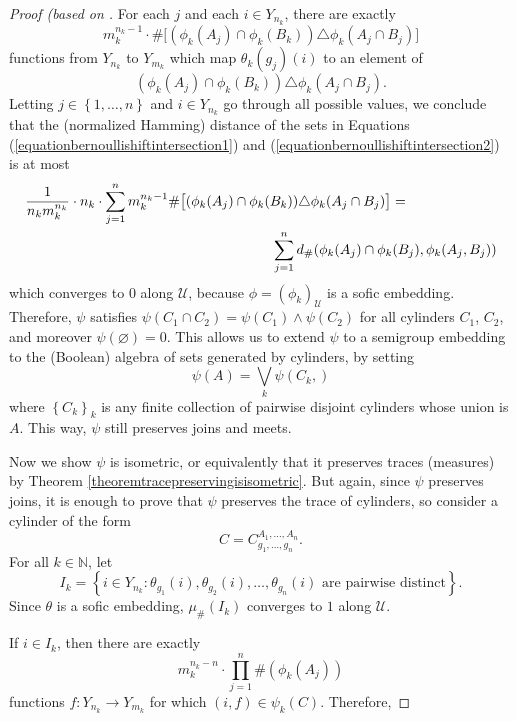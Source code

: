 \begin{proof}[Proof (based on \cite{ozawasoficnotes}]
For each $j$ and each $i\in Y_{n_k}$, there are exactly
\[m_k^{n_k-1}\cdot\#\big[(\phi_k(A_j)\cap\phi_k(B_k))\triangle\phi_k(A_j\cap B_j)\big]\]
functions from $Y_{n_k}$ to $Y_{m_k}$ which map $\theta_k(g_j)(i)$ to an element of
\[(\phi_k(A_j)\cap\phi_k(B_k))\triangle\phi_k(A_j\cap B_j).\]
Letting $j\in\left\{1,\ldots,n\right\}$ and $i\in Y_{n_k}$ go through all possible values, we conclude that the (normalized Hamming) distance of the sets in Equations (\ref{equationbernoullishiftintersection1}) and (\ref{equationbernoullishiftintersection2}) is at most
\begin{align*}
\frac{1}{n_km_k^{n_k}}\cdot n_k\cdot \sum_{j=1}^nm_k^{n_k-1}\#\big[(\phi_k(A_j)\cap\phi_k(B_k))\triangle\phi_k(A_j\cap B_j)\big]\hspace{-3cm}&\hspace{3cm}=\\
&\sum_{j=1}^nd_{\#}(\phi_k(A_j)\cap\phi_k(B_j),\phi_k(A_j,B_j))
\end{align*}
which converges to $0$ along $\mathcal{U}$, because $\phi=(\phi_k)_\mathcal{U}$ is a sofic embedding. Therefore, $\psi$ satisfies $\psi(C_1\cap C_2)=\psi(C_1)\land\psi(C_2)$ for all cylinders $C_1$, $C_2$, and moreover $\psi(\varnothing)=0$. This allows us to extend $\psi$ to a semigroup embedding to the (Boolean) algebra of sets generated by cylinders, by setting
\[\psi(A)=\bigvee_k\psi(C_k,)\]
where $\left\{C_k\right\}_k$ is any finite collection of pairwise disjoint cylinders whose union is $A$. This way, $\psi$ still preserves joins and meets.

Now we show $\psi$ is isometric, or equivalently that it preserves traces (measures)  by Theorem \ref{theoremtracepreservingisisometric}. But again, since $\psi$ preserves joins, it is enough to prove that $\psi$ preserves the trace of cylinders, so consider a cylinder of the form
\[C=C_{g_1,\ldots,g_n}^{A_1,\ldots,A_n}.\]
For all $k\in\mathbb{N}$, let
\[I_k=\left\{i\in Y_{n_k}:\theta_{g_1}(i),\theta_{g_2}(i),\ldots,\theta_{g_n}(i)\text{ are pairwise distinct}\right\}.\]
Since $\theta$ is a sofic embedding, $\mu_\#(I_k)$ converges to $1$ along $\mathcal{U}$.

If $i\in I_k$, then there are exactly
\[m_k^{n_k-n}\cdot\prod_{j=1}^n\#\left(\phi_k(A_j)\right)\]
functions $f:Y_{n_k}\to Y_{m_k}$ for which $(i,f)\in\psi_k(C)$. Therefore,


\end{proof}
